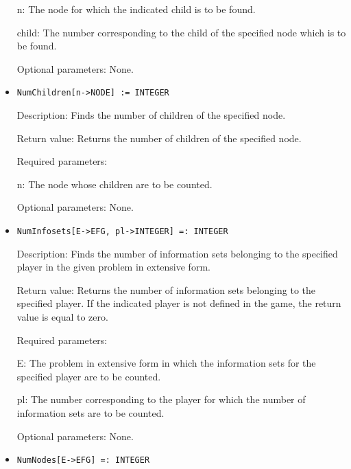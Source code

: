\begin{itemize}
\bd
\item
[n:] The node for which the indicated child is to be found.
\item
[child:] The number corresponding to the child of the specified node
which is to be found.
\ed

\item 
[Optional parameters:] None.
\ed

\item
\protect \large \begin{verbatim}
NumChildren[n->NODE] := INTEGER
\end{verbatim}\normalsize

\bd
\item
[Description:] Finds the number of children of the specified node.
\item
[Return value:] Returns the number of children of the specified node.
\item
[Required parameters:]\hfil\null

\bd
\item
[n:] The node whose children are to be counted.
\ed

\item
[Optional parameters:] None.
\ed

\item
\protect \large \begin{verbatim}
NumInfosets[E->EFG, pl->INTEGER] =: INTEGER
\end{verbatim}\normalsize

\bd
\item
[Description:] Finds the number of information sets belonging to the
specified player in the given problem in extensive form.
\item
[Return value:] Returns the number of information sets belonging to
the specified player.  If the indicated player is not defined in the
game, the return value is equal to zero.
\item
[Required parameters:]\hfil\null

\bd
\item
[E:] The problem in extensive form in which the information sets for
the specified player are to be counted.
\item
[pl:] The number corresponding to the player for which the number of
information sets are to be counted.
\ed
\item
 [Optional parameters:] None.
\ed

\item
\protect \large \begin{verbatim}
NumNodes[E->EFG] =: INTEGER
\end{verbatim}\normalsize


\end{itemize}
